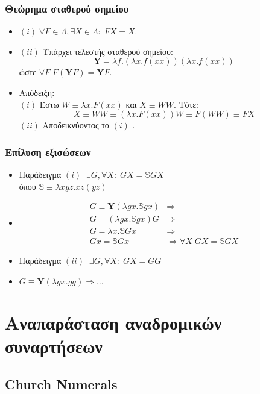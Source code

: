 \documentclass{beamer}
\begin{document}
\begin{frame}
  \frametitle{Θεώρημα σταθερού σημείου}
  \begin{itemize}
  \item $ (i) \; \forall F \in \Lambda , \exists X \in \Lambda: \; F X
    = X. $ \pause
  \item $ (ii) $ Υπάρχει τελεστής σταθερού σημείου:
    \[ \textbf{Y} = \lambda f . (\lambda x . f (xx)) (\lambda x . f (xx)) \]
    ώστε $ \forall F \; F (\textbf{Y} F) = \textbf{Y} F $. \pause
  \item Απόδειξη: \\
    $ (i) $ Έστω $ W \equiv \lambda x . F (xx) $ και $ X \equiv W W $. Τότε:
    \[ X \equiv W W \equiv (\lambda x . F (xx)) W \equiv F (WW) \equiv F X \] \pause
    $ (ii) $ Αποδεικνύοντας το $ (i) $ .
  \end{itemize}
\end{frame}

\begin{frame}
  \frametitle{Επίλυση εξισώσεων}
  \begin{itemize}
  \item Παράδειγμα $(i) \; \; \exists G, \forall X: \; G X =
    \mathbb{S} G X $ \\ όπου $ \mathbb{S} \equiv \lambda x y z . x z
    (y z) $ \pause
  \item $$ \begin{array}{ll}
    G \equiv \textbf{Y} (\lambda g x. \mathbb{S} g x) & \Rightarrow  \\
    G = (\lambda g x. \mathbb{S} g x) G & \Rightarrow  \\
    G = \lambda x . \mathbb{S} G x & \Rightarrow  \\
    G x = \mathbb{S} G x & \Rightarrow \forall X \; G X = \mathbb{S} G X
  \end{array} $$  \pause
  \item Παράδειγμα $(ii) \; \; \exists G, \forall X: \; G X = G G $
    \pause
  \item $ G \equiv \textbf{Y} (\lambda g x. g g) \Rightarrow \ldots $
  \end{itemize}
\end{frame}

\section{Αναπαράσταση αναδρομικών συναρτήσεων}

\subsection{Church Numerals}
\end{document}
